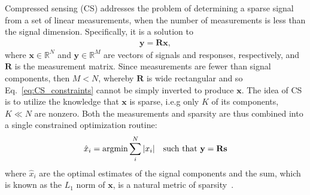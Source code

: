 \documentclass[9pt,twoside]{pnas-new}
\begin{document}
Compressed sensing (CS) addresses the problem of determining a sparse signal from a set of linear measurements, when the number of measurements is less than the signal dimension. Specifically, it is a solution to 
\begin{align}
\mathbf y = \mathbf R\mathbf x,
\label{eq:CS_constraints}
\end{align} where $\mathbf x \in \mathbb{R}^N$ and $\mathbf y\in \mathbb{R}^M$ are vectors of signals and responses, respectively, and $\mathbf R$ is the measurement matrix. Since measurements are fewer than signal components, then $M < N$, whereby $\mathbf R$ is wide rectangular and so Eq.~\ref{eq:CS_constraints} cannot be simply inverted to produce $\mathbf x$. The idea of CS is to utilize the knowledge that $\mathbf x$ is sparse, i.e.g only $K$ of its components, $K \ll N$ are nonzero. Both the measurements and sparsity are thus combined into a single constrained optimization routine:
\begin{align}
\hat x_i = \textup{argmin} \sum_i^N |x_i| \quad \textup{such that } \mathbf y = \mathbf R\mathbf s
\label{eq:CS}
\end{align}
where $\hat x_i$ are the optimal estimates of the signal components and the sum, which is known as the $L_1$ norm of $\mathbf x$, is a natural metric of sparsity~\cite{CS_donoho}. 
\end{document}
